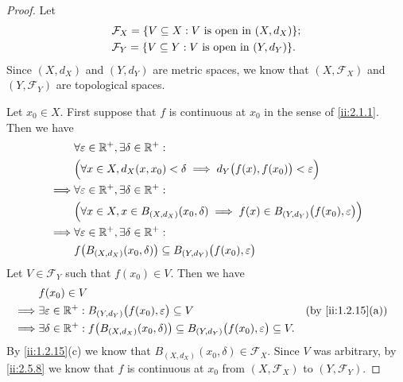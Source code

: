 \begin{proof}
  Let
  \begin{align*}
     & \mathcal{F}_X = \set{V \subseteq X : V \text{ is open in } (X, d_X)}; \\
     & \mathcal{F}_Y = \set{V \subseteq Y : V \text{ is open in } (Y, d_Y)}.
  \end{align*}
  Since \((X, d_X)\) and \((Y, d_Y)\) are metric spaces, we know that \((X, \mathcal{F}_X)\) and \((Y, \mathcal{F}_Y)\) are topological spaces.

  Let \(x_0 \in X\).
  First suppose that \(f\) is continuous at \(x_0\) in the sense of \cref{ii:2.1.1}.
  Then we have
  \begin{align*}
             & \forall \varepsilon \in \mathbb{R}^+, \exists \delta \in \mathbb{R}^+ :                                                                \\
             & \Big(\forall x \in X, d_X(x, x_0) < \delta \implies d_Y\big(f(x), f(x_0)\big) < \varepsilon\Big)                       \\
    \implies & \forall \varepsilon \in \mathbb{R}^+, \exists \delta \in \mathbb{R}^+ :                                                                \\
             & \Big(\forall x \in X, x \in B_{(X, d_X)}(x_0, \delta) \implies f(x) \in B_{(Y, d_Y)}\big(f(x_0), \varepsilon\big)\Big) \\
    \implies & \forall \varepsilon \in \mathbb{R}^+, \exists \delta \in \mathbb{R}^+ :                                                                \\
             & f\big(B_{(X, d_X)}(x_0, \delta)\big) \subseteq B_{(Y, d_Y)}\big(f(x_0), \varepsilon\big)
  \end{align*}
  Let \(V \in \mathcal{F}_Y\) such that \(f(x_0) \in V\).
  Then we have
  \begin{align*}
             & f(x_0) \in V                                                                                                                                           \\
    \implies & \exists \varepsilon \in \R^+ : B_{(Y, d_Y)}\big(f(x_0), \varepsilon\big) \subseteq V                                            &  & \by{ii:1.2.15}[a] \\
    \implies & \exists \delta \in \R^+ : f\big(B_{(X, d_X)}(x_0, \delta)\big) \subseteq B_{(Y, d_Y)}\big(f(x_0), \varepsilon\big) \subseteq V.
  \end{align*}
  By \cref{ii:1.2.15}(c) we know that \(B_{(X, d_X)}(x_0, \delta) \in \mathcal{F}_X\).
  Since \(V\) was arbitrary, by \cref{ii:2.5.8} we know that \(f\) is continuous at \(x_0\) from \((X, \mathcal{F}_X)\) to \((Y, \mathcal{F}_Y)\).


\end{proof}
